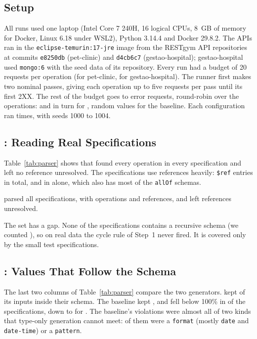 \subsection{Setup}
\label{sec:setup}
All runs used one laptop (Intel Core 7 240H, 16 logical CPUs, 8~GB of memory
for Docker, Linux 6.18 under WSL2), Python 3.14.4 and Docker 29.8.2. The APIs
ran in the \texttt{eclipse-temurin:17-jre} image from the RESTgym API
repositories at commits \texttt{e8250db} (pet-clinic) and \texttt{d4cb6c7}
(gestao-hospital); gestao-hospital used \texttt{mongo:6} with the seed data
of its repository. Every run had a budget of 20 requests per operation
(\NPetclinicBudget for pet-clinic, \NGestaohospitalBudget for
gestao-hospital). The runner first makes two nominal passes, giving each
operation up to five  requests per pass until its first 2XX. The
rest of the budget goes to error requests, round-robin over the operations:
 and  in turn for \tool, random values for the
baseline. Each configuration ran \NReps times, with seeds 1000 to 1004.

\subsection{: Reading Real Specifications}
\label{sec:rq1}



Table~\ref{tab:parser} shows that \tool found every operation in every
specification and left no reference unresolved. The specifications use
references heavily: \NRefsTotal \texttt{\$ref} entries in total, and
\NRefsMax in \NRefsMaxApi alone, which also has most of the \NAllofTotal
\texttt{allOf} schemas.

\begin{observation}
\label{obs:parse}
\tool parsed all \NSpecs specifications, with \NOpsTotal operations and
\NRefsTotal references, and left \NRefsLeft references unresolved.
\end{observation}

The set has a gap. None of the \NSpecs specifications contains a recursive
schema (we counted \NRecursiveTotal), so on real data the cycle rule of
Step~1 never fired. It is covered only by the small test specifications.

\subsection{: Values That Follow the Schema}
\label{sec:rq2}
The last two columns of Table~\ref{tab:parser} compare the two generators.
\tool kept \NConfTool of its \NConfToolInputs inputs inside their schema.
The baseline kept \NConfBaseline, and fell below 100\% in
\NConfBaselineBelow of the \NSpecs specifications, down to
\NConfBaselineMin for \NConfBaselineWorstApi. The baseline's \NViolBaseline
violations were almost all of two kinds that type-only generation cannot
meet: \NViolBaselineFormatPattern of them were a \texttt{format} (mostly
\texttt{date} and \texttt{date-time}) or a \texttt{pattern}.

